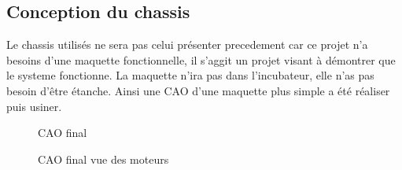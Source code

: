 \documentclass[a4paper, 11pt]{article}
\begin{document}
\subsection{Conception du chassis}
Le chassis utilisés ne sera pas celui présenter precedement car ce projet n'a besoins
d'une maquette fonctionnelle, il s'aggit un projet visant à démontrer que
le systeme fonctionne. La maquette n'ira pas dans l'incubateur, elle n'as pas
besoin d'être étanche.
Ainsi une CAO d'une maquette plus simple a été réaliser puis usiner.
\begin{multicols}{2}
    \begin{figure}[H]
        \centering
        \caption{CAO final}
        \label{fig:CAO_final}
    \end{figure}
    \begin{figure}[H]
        \centering
        \caption{CAO final vue des moteurs}
        \label{fig:CAO_final_dos}
    \end{figure}
\end{multicols}
\end{document}
